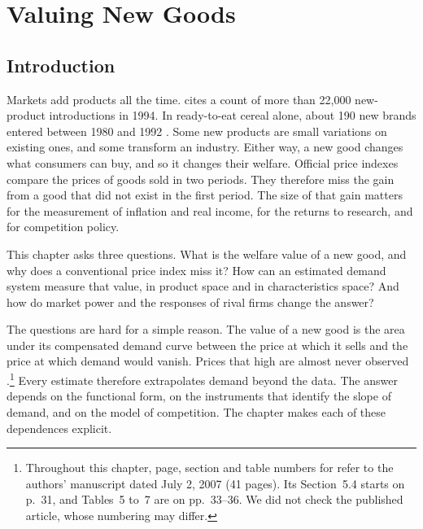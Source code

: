 \chapter{Valuing New Goods}\label{ch:newgoods}

\section{Introduction}\label{sec:10-intro}

Markets add products all the time. \citet[p.~237]{Bresnahan1997} cites a count of more than 22,000 new-product
introductions in 1994. In ready-to-eat cereal alone, about 190 new brands entered between 1980 and 1992
\citep[pp.~213--215]{Hausman1997}. Some new products are small variations on existing ones, and some transform an
industry. Either way, a new good changes what consumers can buy, and so it changes their welfare. Official price
indexes compare the prices of goods sold in two periods. They therefore miss the gain from a good that did not
exist in the first period. The size of that gain matters for the measurement of inflation and real income, for
the returns to research, and for competition policy.

This chapter asks three questions. What is the welfare value of a new good, and why does a conventional price
index miss it? How can an estimated demand system measure that value, in product space and in characteristics
space? And how do market power and the responses of rival firms change the answer?

The questions are hard for a simple reason. The value of a new good is the area under its compensated demand
curve between the price at which it sells and the price at which demand would vanish. Prices that high are
almost never observed \citep[Section~1]{BerryPakes2007}.\footnote{Throughout this chapter, page, section and table
numbers for \citet{BerryPakes2007} refer to the authors' manuscript dated July 2, 2007 (41 pages). Its Section~5.4
starts on p.~31, and Tables~5 to~7 are on pp.~33--36. We did not check the published article, whose numbering may
differ.} Every estimate therefore extrapolates demand beyond the
data. The answer depends on the functional form, on the instruments that identify the slope of demand, and on
the model of competition. The chapter makes each of these dependences explicit.


